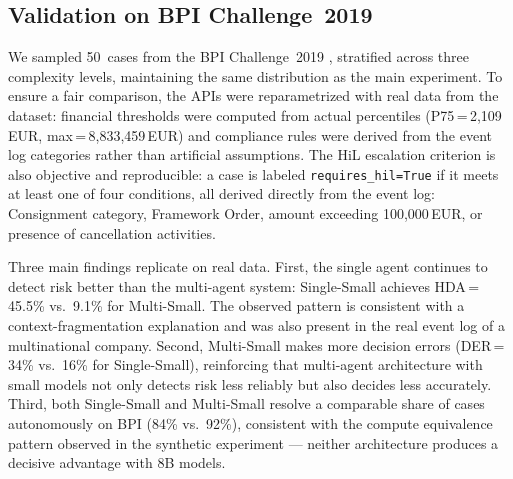 \documentclass[preprint,12pt,numrefs]{elsarticle}
\begin{document}
\subsection{Validation on BPI Challenge~2019}
We sampled 50~cases from the BPI Challenge~2019
\citep{vandongen2019bpi}, stratified across three complexity levels,
maintaining the same distribution as the main experiment.
To ensure a fair comparison, the APIs were reparametrized with real
data from the dataset: financial thresholds were computed from actual
percentiles (P75\,=\,2,109\,EUR, max\,=\,8,833,459\,EUR) and compliance
rules were derived from the event log categories rather than artificial
assumptions.
The HiL escalation criterion is also objective and reproducible: a case
is labeled \texttt{requires\_hil=True} if it meets at least one of four
conditions, all derived directly from the event log: Consignment
category, Framework Order, amount exceeding 100,000\,EUR, or presence
of cancellation activities.
\begin{table}[H]
\centering
\caption{BPI Challenge~2019 vs.\ synthetic dataset comparison. The
         fragmentation patterns replicate on real data. Synthetic
         values for Single-Small-XL and Multi-Small report the mean
         over four replications.}
\label{tab:bpi}
\end{table}
Three main findings replicate on real data. First, the single agent
continues to detect risk better than the multi-agent system:
Single-Small achieves HDA\,=\,45.5\% vs.\ 9.1\% for Multi-Small.
The observed pattern is consistent with a context-fragmentation
explanation and was also present in the real event log of a
multinational company. Second, Multi-Small makes more decision errors
(DER\,=\,34\% vs.\ 16\% for Single-Small), reinforcing that
multi-agent architecture with small models not only detects risk less
reliably but also decides less accurately. Third, both Single-Small
and Multi-Small resolve a comparable share of cases autonomously on
BPI (84\% vs.\ 92\%), consistent with the compute equivalence pattern
observed in the synthetic experiment --- neither architecture produces
a decisive advantage with 8B models.
\end{document}

